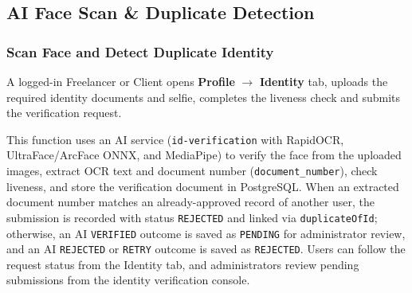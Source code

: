 
\subsection{AI Face Scan \& Duplicate Detection}

\subsubsection{Scan Face and Detect Duplicate Identity}

 A logged-in Freelancer or Client opens \textbf{Profile} $\rightarrow$ \textbf{Identity} tab, uploads the required identity documents and selfie, completes the liveness check and submits the verification request.

 This function uses an AI service (\texttt{id-verification} with RapidOCR, UltraFace/ArcFace ONNX, and MediaPipe) to verify the face from the uploaded images, extract OCR text and document number (\texttt{document\_number}), check liveness, and store the verification document in PostgreSQL. When an extracted document number matches an already-approved record of another user, the submission is recorded with status \texttt{REJECTED} and linked via \texttt{duplicateOfId}; otherwise, an AI \texttt{VERIFIED} outcome is saved as \texttt{PENDING} for administrator review, and an AI \texttt{REJECTED} or \texttt{RETRY} outcome is saved as \texttt{REJECTED}. Users can follow the request status from the Identity tab, and administrators review pending submissions from the identity verification console.


